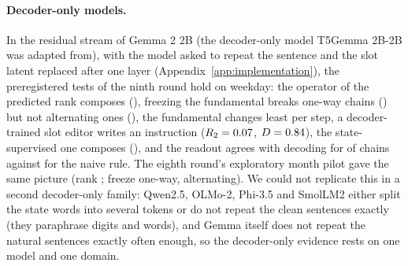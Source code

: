 \paragraph{Decoder-only models.}
In the residual stream of Gemma 2 2B (the decoder-only model T5Gemma 2B-2B was adapted from), with the model asked to repeat the sentence
and the slot latent replaced after one layer (Appendix~\ref{app:implementation}), the preregistered tests of the ninth round hold on
weekday: the operator of the predicted rank \CLtwentyfiveRstar{} composes (\CLtwentyfiveRtwoN{}), freezing the fundamental breaks one-way
chains (\CLtwentyfiveFonePlus{}) but not alternating ones (\CLtwentyfiveFoneAlt{}), the fundamental changes least per step, a
decoder-trained slot editor writes an instruction ($R_{2} = 0.07{}$, $D = 0.84{}$), the state-supervised
one composes (\CLtwentyfiveCThree{}), and the readout agrees with decoding for \CLtwentyfiveAgree{} of chains against
\CLtwentyfiveNaive{} for the naive rule. The eighth round's exploratory month pilot gave the same picture (rank \CLnineteenRstar{}; freeze
\CLnineteenFonePlus{} one-way, \CLnineteenFoneAlt{} alternating). We could not replicate this in a second decoder-only family: Qwen2.5,
OLMo-2, Phi-{3.5} and SmolLM2 either split the state words into several tokens or do not repeat the clean sentences exactly (they
paraphrase digits and words), and Gemma itself does not repeat the natural sentences exactly often enough, so the decoder-only evidence
rests on one model and one domain.


